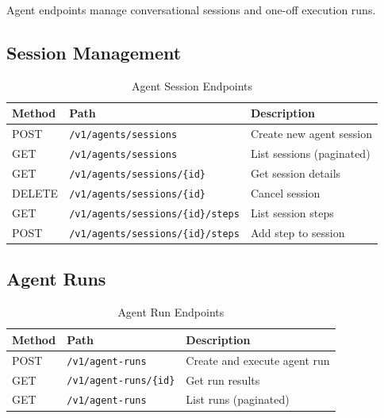 \documentclass[a4paper,twoside]{sapthesis}
\begin{document}
Agent endpoints manage conversational sessions and one-off execution runs.

\subsection{Session Management}

\begin{table}[ht]
\centering
\caption{Agent Session Endpoints}
\label{tab:agent-session-endpoints}
\small
\begin{tabularx}{\textwidth}{llX}
    \hline
    \textbf{Method} & \textbf{Path} & \textbf{Description} \\
    \hline
    POST & \texttt{/v1/agents/sessions} & Create new agent session \\
    GET & \texttt{/v1/agents/sessions} & List sessions (paginated) \\
    GET & \texttt{/v1/agents/sessions/\{id\}} & Get session details \\
    DELETE & \texttt{/v1/agents/sessions/\{id\}} & Cancel session \\
    GET & \texttt{/v1/agents/sessions/\{id\}/steps} & List session steps \\
    POST & \texttt{/v1/agents/sessions/\{id\}/steps} & Add step to session \\
    \hline
\end{tabularx}
\end{table}

\subsection{Agent Runs}

\begin{table}[ht]
\centering
\caption{Agent Run Endpoints}
\label{tab:agent-run-endpoints}
\small
\begin{tabularx}{\textwidth}{llX}
    \hline
    \textbf{Method} & \textbf{Path} & \textbf{Description} \\
    \hline
    POST & \texttt{/v1/agent-runs} & Create and execute agent run \\
    GET & \texttt{/v1/agent-runs/\{id\}} & Get run results \\
    GET & \texttt{/v1/agent-runs} & List runs (paginated) \\
    \hline
\end{tabularx}
\end{table}

\end{document}
